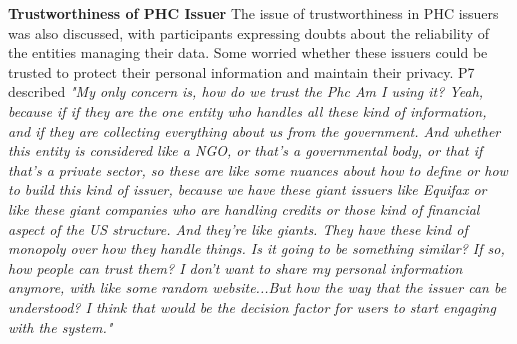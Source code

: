 
\iffalse
\textbf{Trustworthiness of PHC Issuer} The issue of trustworthiness in PHC issuers was also discussed, with participants expressing doubts about the reliability of the entities managing their data. Some worried whether these issuers could be trusted to protect their personal information and maintain their privacy. P7 described \textit{"My only concern is, how do we trust the Phc Am I using it? Yeah, because if if they are the one entity who handles all these kind of information, and if they are collecting everything about us from the government. And whether this entity is considered like a NGO, or that's a governmental body, or that if that's a private sector, so these are like some nuances about how to define or how to build this kind of issuer, because we have these giant issuers like Equifax or like these giant companies who are handling credits or those kind of financial aspect of the US structure. And they're like giants. They have these kind of monopoly over how they handle things. Is it going to be something similar? If so, how people can trust them? I don't want to share my personal information anymore, with like some random website...But how the way that the issuer can be understood? I think that would be the decision factor for users to start engaging with the system."}

